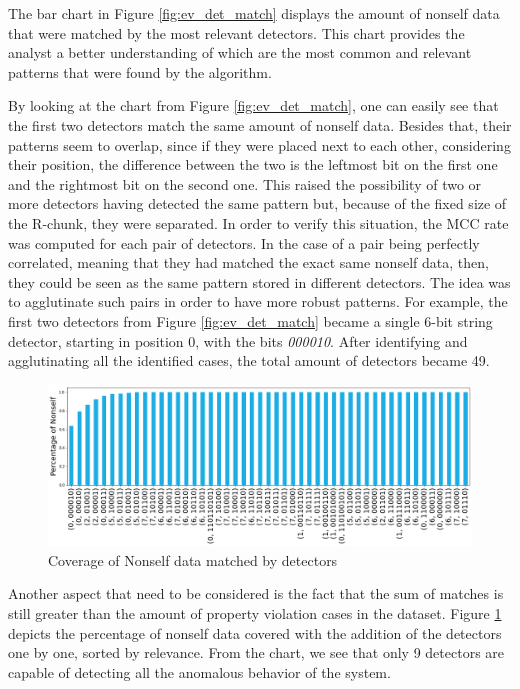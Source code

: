 The bar chart in Figure \ref{fig:ev_det_match} displays the amount of nonself data that were matched by the most relevant detectors. This chart provides the analyst a better understanding of which are the most common and relevant patterns that were found by the algorithm.

By looking at the chart from Figure \ref{fig:ev_det_match}, one can easily see that the first two detectors match the same amount of nonself data. Besides that, their patterns seem to overlap, since if they were placed next to each other, considering their position, the difference between the two is the leftmost bit on the first one and the rightmost bit on the second one. This raised the possibility of two or more detectors having detected the same pattern but, because of the fixed size of the R-chunk, they were separated. In order to verify this situation, the MCC rate was computed for each pair of detectors. In the case of a pair being perfectly correlated, meaning that they had matched the exact same nonself data, then, they could be seen as the same pattern stored in different detectors. The idea was to agglutinate such pairs in order to have more robust patterns. For example, the first two detectors from Figure \ref{fig:ev_det_match} became a single 6-bit string detector, starting in position 0, with the bits \textit{000010}. After identifying and agglutinating all the identified cases, the total amount of detectors became 49.

\begin{figure}[]
	\centering
	\includegraphics[width=\textwidth, keepaspectratio]{img/det_coverage.png}
	\caption{Coverage of Nonself data matched by detectors}
	\label{fig:ev_det_cov}
\end{figure}

Another aspect that need to be considered is the fact that the sum of matches is still greater than the amount of property violation cases in the dataset. Figure \ref{fig:ev_det_cov} depicts the percentage of nonself data covered with the addition of the detectors one by one, sorted by relevance. From the chart, we see that only 9 detectors are capable of detecting all the anomalous behavior of the system. 



